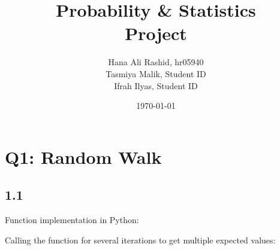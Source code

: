 \documentclass[answers]{exam}
\title{Probability \& Statistics\\ Project}
\author{Hana Ali Rashid, hr05940\\ Tasmiya Malik, Student ID\\ Ifrah Ilyas, Student ID}
\date{\today{}}
\begin{document}
\maketitle



\section*{Q1: Random Walk}
\subsection*{1.1}
Function implementation in Python:

Calling the function for several iterations to get multiple expected values:

\pagebreak
\end{document}
